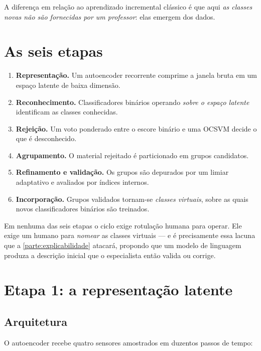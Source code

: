 A diferença em relação ao aprendizado incremental clássico é que aqui \emph{as classes
novas não são fornecidas por um professor}: elas emergem dos dados.

\section{As seis etapas}

\begin{enumerate}[leftmargin=*,itemsep=0.4em]
  \item \textbf{Representação.} Um autoencoder recorrente comprime a janela bruta em um
        espaço latente de baixa dimensão.
  \item \textbf{Reconhecimento.} Classificadores binários operando \emph{sobre o espaço
        latente} identificam as classes conhecidas.
  \item \textbf{Rejeição.} Um voto ponderado entre o escore binário e uma OCSVM decide
        o que é desconhecido.
  \item \textbf{Agrupamento.} O material rejeitado é particionado em grupos candidatos.
  \item \textbf{Refinamento e validação.} Os grupos são depurados por um limiar
        adaptativo e avaliados por índices internos.
  \item \textbf{Incorporação.} Grupos validados tornam-se \emph{classes virtuais}, sobre
        as quais novos classificadores binários são treinados.
\end{enumerate}

\begin{destaque}
Em nenhuma das seis etapas o ciclo exige rotulação humana para operar. Ele exige um
humano para \emph{nomear} as classes virtuais --- e é precisamente essa lacuna que a
\cref{parte:explicabilidade} atacará, propondo que um modelo de linguagem produza a
descrição inicial que o especialista então valida ou corrige.
\end{destaque}

\section{Etapa 1: a representação latente}

\subsection{Arquitetura}

O autoencoder recebe quatro sensores amostrados em duzentos passos de tempo:

